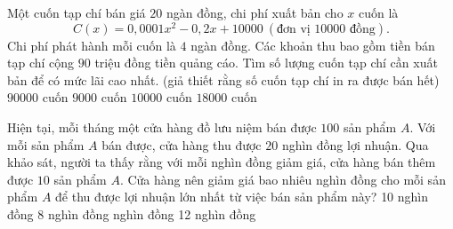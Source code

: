 \begin{ex}%
	Một cuốn tạp chí bán giá $20$ ngàn đồng, chi phí xuất bản cho $x$ cuốn là
	$$C(x)=0{,}0001 x^2 -0{,}2x +10000 \ (\text{đơn vị 10000 đồng}).$$
	Chi phí phát hành mỗi cuốn là $4$ ngàn đồng. Các khoản thu bao gồm tiền bán tạp chí cộng $90$ triệu đồng tiền quảng cáo. Tìm số lượng cuốn tạp chí cần xuất bản để có mức lãi cao nhất. (giả thiết rằng số cuốn tạp chí in ra được bán hết)
	\choice
	{$90000$ cuốn}
	{\True $9000$ cuốn}
	{$10000$ cuốn}
	{$18000$ cuốn}
\end{ex}
\begin{ex}%
	Hiện tại, mỗi tháng một cửa hàng đồ lưu niệm bán được $100$ sản phẩm $A$. Với mỗi sản phẩm $A$ bán được, cửa hàng thu được $20$ nghìn đồng lợi nhuận. Qua khảo sát, người ta thấy rằng với mỗi nghìn đồng giảm giá, cửa hàng bán thêm được $10$ sản phẩm $A$. Cửa hàng nên giảm giá bao nhiêu nghìn đồng cho mỗi sản phẩm $A$ để thu được lợi nhuận lớn nhất từ việc bán sản phẩm này?\choice
	{10 nghìn đồng}
	{8 nghìn đồng}
	{ nghìn đồng}
	{12 nghìn đồng}
\end{ex}
